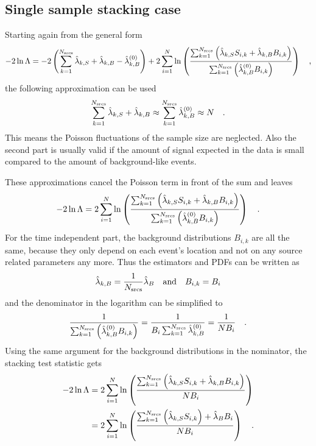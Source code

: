 \subsection{Single sample stacking case}
Starting again from the general form
\begin{equation}
  -2\ln\Lambda
  = -2\left(\sum_{k=1}^{N_\text{srcs}}\hat{\lambda}_{k,S} +
                                      \hat{\lambda}_{k,B} -
                                      \hat{\lambda}_{k,B}^{(0)}\right) +
    2\sum_{i=1}^N \ln\left(
      \frac{\sum_{k=1}^{N_\text{srcs}}\left(
          \hat{\lambda}_{k,S} S_{i,k}+\hat{\lambda}_{k,B} B_{i,k}\right)}
          {\sum_{k=1}^{N_\text{srcs}}\left(
            \hat{\lambda}_{k,B}^{(0)} B_{i,k}
          \right)}
        \right)
  \quad\text{,}
\end{equation}
the following approximation can be used
\begin{equation}
  \sum_{k=1}^{N_\text{srcs}} \hat{\lambda}_{k,S} + \hat{\lambda}_{k,B} \approx
    \sum_{k=1}^{N_\text{srcs}} \hat{\lambda}_{k,B}^{(0)} \approx N
  \quad\text{.}
\end{equation}
This means the Poisson fluctuations of the sample size are neglected.
Also the second part is usually valid if the amount of signal expected in the data is small compared to the amount of background-like events.

These approximations cancel the Poisson term in front of the sum and leaves
\begin{equation}
  -2\ln\Lambda
  = 2\sum_{i=1}^N \ln\left(
    \frac{\sum_{k=1}^{N_\text{srcs}}\left(
          \hat{\lambda}_{k,S} S_{i,k}+\hat{\lambda}_{k,B} B_{i,k}\right)}
          {\sum_{k=1}^{N_\text{srcs}}\left(
            \hat{\lambda}_{k,B}^{(0)} B_{i,k} \right)}
        \right)
  \quad\text{.}
\end{equation}
For the time independent part, the background distributions $B_{i,k}$ are all the same, because they only depend on each event's location and not on any source related parameters any more.
Thus the estimators and PDFs can be written as
\begin{equation}
  \hat{\lambda}_{k,B} = \frac{1}{N_\text{srcs}} \hat{\lambda}_B
  \quad\text{and}\quad B_{i,k} = B_i
\end{equation}
and the denominator in the logarithm can be simplified to
\begin{equation}
  \frac{1}{\sum_{k=1}^{N_\text{srcs}}\left(
           \hat{\lambda}_{k,B}^{(0)}B_{i,k} \right)}
  = \frac{1}{B_i \sum_{k=1}^{N_\text{srcs}}\hat{\lambda}_{k,B}^{(0)}}
  = \frac{1}{N B_i}
  \quad\text{.}
\end{equation}
Using the same argument for the background distributions in the nominator, the stacking test statistic gets
\begin{align}
  -2\ln\Lambda
  &= 2\sum_{i=1}^N \ln\left(
    \frac{\sum_{k=1}^{N_\text{srcs}}\left(
          \hat{\lambda}_{k,S} S_{i,k}+\hat{\lambda}_{k,B} B_{i,k}\right)}
          {N B_i} \right) \\
  &= 2\sum_{i=1}^N \ln\left(
    \frac{\sum_{k=1}^{N_\text{srcs}}\left(\hat{\lambda}_{k,S} S_{i,k}\right) +
          \hat{\lambda}_B B_i}{N B_i} \right)
  \quad\text{.}
\end{align}

